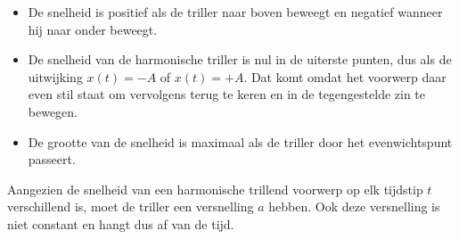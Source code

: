 \documentclass{ximera}
\begin{document}
\begin{image}
    \end{image}

\begin{itemize}
    \item De snelheid is positief als de triller naar boven beweegt en negatief wanneer hij naar onder beweegt.
    \item De snelheid van de harmonische triller is nul in de uiterste punten, dus als de uitwijking $x(t)=-A$ of $x(t)=+A$. 
    Dat komt omdat het voorwerp daar even stil staat om vervolgens terug te keren en in de tegengestelde zin te bewegen.
    \item De grootte van de snelheid is maximaal als de triller door het evenwichtspunt passeert.

\end{itemize}


Aangezien de snelheid van een harmonische trillend voorwerp op elk tijdstip $t$ verschillend is, moet de triller een versnelling $a$ hebben. Ook deze versnelling is niet constant en hangt dus af van de tijd.
\end{document}
